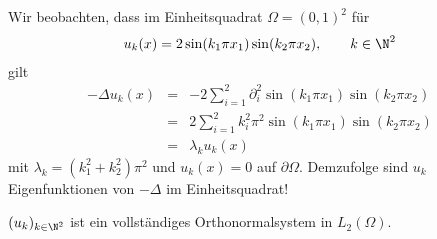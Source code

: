 Wir beobachten, dass im Einheitsquadrat $\Omega = (0, 1)^2$ für
\begin{eqnarray*}
    u_k(x) = 2 \sin(k_1 \pi x_1) \sin(k_2 \pi x_2), \qquad k \in
    \N^2
\end{eqnarray*}
gilt
\begin{eqnarray*}
      -\Delta u_k(x)
    &=& -2 \sum_{i=1}^2 \partial_i^2
        \sin(k_1 \pi x_1) \sin(k_2 \pi x_2) \\
    &=& 2 \sum_{i=1}^2 k_i^2 \pi^2 \sin(k_1 \pi x_1)
        \sin(k_2 \pi x_2) \\
    &=& \lambda_k u_k(x)
\end{eqnarray*}
mit $\lambda_k = (k_1^2 + k_2^2) \pi^2$ und $u_k(x) = 0$ auf
$\partial\Omega$. Demzufolge sind $u_k$ Eigenfunktionen von $-\Delta$ im
Einheitsquadrat!


\begin{Satz}
    \label{satz:2.16}
    $(u_k)_{k\in\N^2}$ ist ein vollständiges Orthonormalsystem in
    $L_2(\Omega)$.
\end{Satz}


